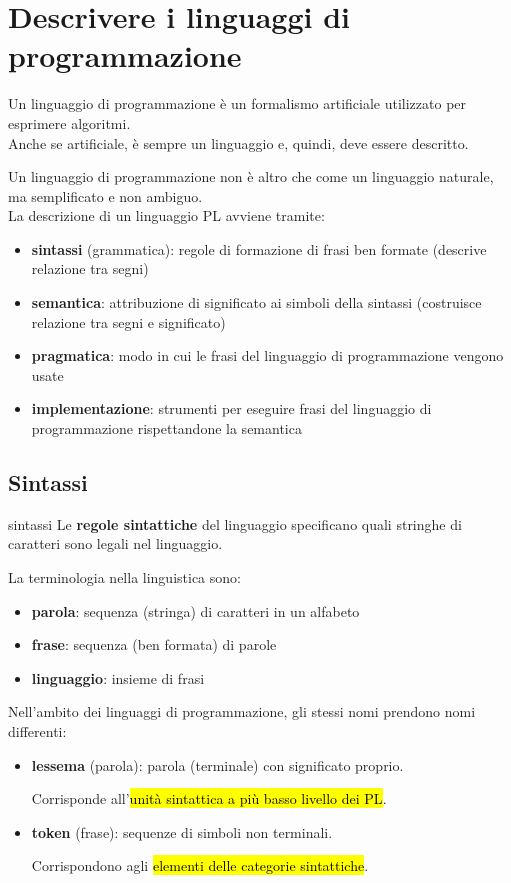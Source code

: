 
\chapter{Descrivere i linguaggi di programmazione}
Un linguaggio di programmazione è un formalismo artificiale utilizzato per esprimere algoritmi.\\[0.2ex]
Anche se artificiale, è sempre un linguaggio e, quindi, deve essere descritto.

\smallskip
Un linguaggio di programmazione non è altro che come un linguaggio naturale, ma semplificato e non ambiguo.\\[0.2ex]
La descrizione di un linguaggio PL avviene tramite:
\begin{itemize}[label=$\triangleright$, itemsep=\smallskipamount]
    \item \textbf{sintassi} (grammatica): regole di formazione di frasi ben formate (descrive relazione tra segni)
    \item \textbf{semantica}: attribuzione di significato ai simboli della sintassi (costruisce relazione tra segni e significato)
    \item \textbf{pragmatica}: modo in cui le frasi del linguaggio di programmazione vengono usate
    \item \textbf{implementazione}: strumenti per eseguire frasi del linguaggio di programmazione rispettandone la semantica
\end{itemize}

\section{Sintassi}
\begin{mydef}{sintassi}
    Le \textbf{regole sintattiche} del linguaggio specificano quali stringhe di caratteri sono legali nel linguaggio.
\end{mydef}

La terminologia nella linguistica sono:
\begin{itemize}[label=$\circ$, itemsep=\smallskipamount]
    \item \textbf{parola}: sequenza (stringa) di caratteri in un alfabeto
    \item \textbf{frase}: sequenza (ben formata) di parole
    \item \textbf{linguaggio}: insieme di frasi
\end{itemize}

Nell'ambito dei linguaggi di programmazione, gli stessi nomi prendono nomi differenti:
\begin{itemize}[label=$\diamond$, itemsep=\smallskipamount]
    \item \textbf{lessema} (parola): parola (terminale) con significato proprio.
    
    Corrisponde all'\hl{unità sintattica a più basso livello dei PL}.
    \item \textbf{token} (frase): sequenze di simboli non terminali.
    
    Corrispondono agli \hl{elementi delle categorie sintattiche}.
\end{itemize}

